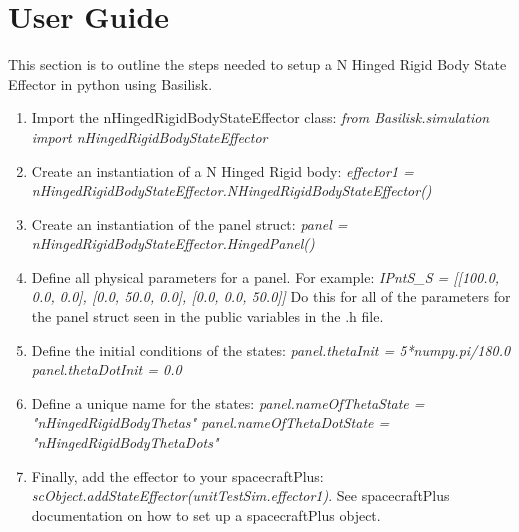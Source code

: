 \section{User Guide}

This section is to outline the steps needed to setup a N Hinged Rigid Body State Effector in python using Basilisk.

\begin{enumerate}
	\item Import the nHingedRigidBodyStateEffector class: \newline \textit{from Basilisk.simulation import nHingedRigidBodyStateEffector}
	\item Create an instantiation of a N Hinged Rigid body: \newline \textit{effector1 = nHingedRigidBodyStateEffector.NHingedRigidBodyStateEffector()}
	\item Create an instantiation of the panel struct: \newline \textit{panel = nHingedRigidBodyStateEffector.HingedPanel()}
	\item Define all physical parameters for a panel. For example: \newline
	\textit{IPntS\_S = [[100.0, 0.0, 0.0], [0.0, 50.0, 0.0], [0.0, 0.0, 50.0]]}
	Do this for all of the parameters for the panel struct seen in the public variables in the .h file.
	\item Define the initial conditions of the states:\newline
	\textit{panel.thetaInit = 5*numpy.pi/180.0 \quad panel.thetaDotInit = 0.0}
	\item Define a unique name for the states:\newline
	\textit{panel.nameOfThetaState = "nHingedRigidBodyThetas" \quad panel.nameOfThetaDotState = "nHingedRigidBodyThetaDots"}
	\item Finally, add the effector to your spacecraftPlus:\newline
	\textit{scObject.addStateEffector(unitTestSim.effector1)}. See spacecraftPlus documentation on how to set up a spacecraftPlus object. 
\end{enumerate}
